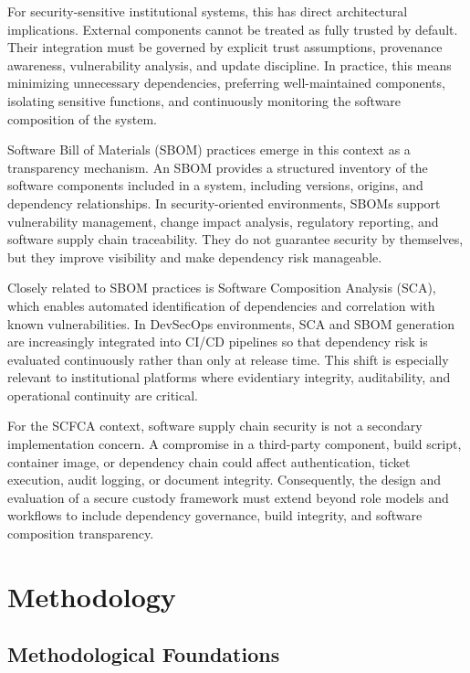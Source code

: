\documentclass[12pt,a4paper]{report}
\begin{document}
For security-sensitive institutional systems, this has direct architectural implications. External components cannot be treated as fully trusted by default. Their integration must be governed by explicit trust assumptions, provenance awareness, vulnerability analysis, and update discipline. In practice, this means minimizing unnecessary dependencies, preferring well-maintained components, isolating sensitive functions, and continuously monitoring the software composition of the system.

Software Bill of Materials (SBOM) practices emerge in this context as a transparency mechanism. An SBOM provides a structured inventory of the software components included in a system, including versions, origins, and dependency relationships. In security-oriented environments, SBOMs support vulnerability management, change impact analysis, regulatory reporting, and software supply chain traceability. They do not guarantee security by themselves, but they improve visibility and make dependency risk manageable.

Closely related to SBOM practices is Software Composition Analysis (SCA), which enables automated identification of dependencies and correlation with known vulnerabilities. In DevSecOps environments, SCA and SBOM generation are increasingly integrated into CI/CD pipelines so that dependency risk is evaluated continuously rather than only at release time. This shift is especially relevant to institutional platforms where evidentiary integrity, auditability, and operational continuity are critical.

For the SCFCA context, software supply chain security is not a secondary implementation concern. A compromise in a third-party component, build script, container image, or dependency chain could affect authentication, ticket execution, audit logging, or document integrity. Consequently, the design and evaluation of a secure custody framework must extend beyond role models and workflows to include dependency governance, build integrity, and software composition transparency.
\chapter{Methodology}

\section{Methodological Foundations}
\end{document}
